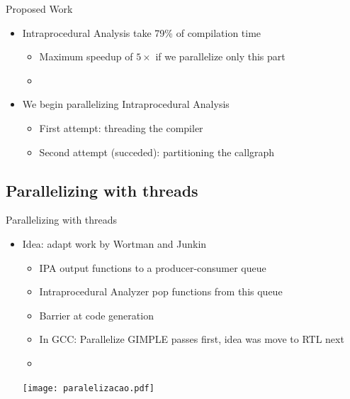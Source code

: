 \begin{frame}{Proposed Work}

\begin{itemize}
    \item Intraprocedural Analysis take 79\% of compilation time
    \begin{itemize}
        \item Maximum speedup of $5\times$ if we parallelize only this part
        \item[]
    \end{itemize}
    \item We begin parallelizing Intraprocedural Analysis
    \begin{itemize}
        \item First attempt: threading the compiler
        \item Second attempt (succeded): partitioning the callgraph
    \end{itemize}
\end{itemize}
\end{frame}

\subsection{Parallelizing with threads}

\begin{frame}{Parallelizing with threads}

\begin{itemize}
    \item Idea: adapt work by Wortman and Junkin \cite{wortman1992}
    \begin{itemize}
        \item IPA output functions to a producer-consumer queue
        \item Intraprocedural Analyzer pop functions from this queue
        \item Barrier at code generation
        \item In GCC: Parallelize GIMPLE passes first, idea was move to RTL next
        \item[]
    \end{itemize}
 \texttt{[image: paralelizacao.pdf]}
\end{itemize}
\end{frame}


